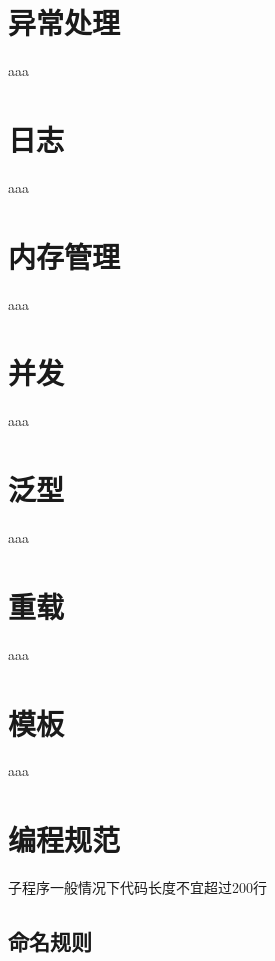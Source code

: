 \documentclass[11pt,a4paper]{article}
\begin{document}
\section{异常处理}

aaa

\section{日志}

aaa

\section{内存管理}

aaa

\section{并发}

aaa

\section{泛型}

aaa

\section{重载}

aaa

\section{模板}

aaa

\section{编程规范}

子程序一般情况下代码长度不宜超过200行

\subsection{命名规则}
\end{document}
